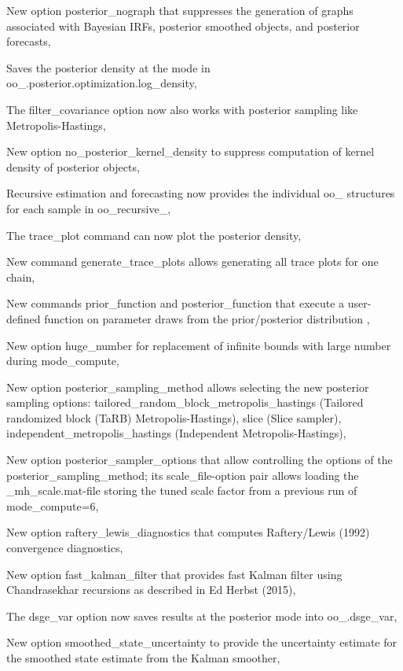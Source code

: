 \documentclass[cn,10pt,math=newtx,citestyle=gb7714-2015,bibstyle=gb7714-2015]{elegantbook}
\begin{document}
\begin{itemize}
		
		New option posterior\_nograph that suppresses the generation of graphs associated with Bayesian IRFs, posterior smoothed objects, and posterior forecasts,
		
		
		Saves the posterior density at the mode in oo\_.posterior.optimization.log\_density,
		
		
		The filter\_covariance option now also works with posterior sampling like Metropolis-Hastings,
		
		
		New option no\_posterior\_kernel\_density to suppress computation of kernel density of posterior objects,
		
		
		Recursive estimation and forecasting now provides the individual
		oo\_ structures for each sample in oo\_recursive\_,
		
		
		The trace\_plot command can now plot the posterior density,
		
		
		New command generate\_trace\_plots allows generating all trace plots for one chain,
		
		
		New commands prior\_function and posterior\_function that execute a user-defined function on parameter draws from the prior/posterior distribution ,
		
		
		New option huge\_number for replacement of infinite bounds with large number during mode\_compute,
		
		
		New option posterior\_sampling\_method allows selecting the new posterior sampling options: tailored\_random\_block\_metropolis\_hastings (Tailored randomized block (TaRB) Metropolis-Hastings), slice (Slice sampler), independent\_metropolis\_hastings (Independent Metropolis-Hastings),
		
		
		New option posterior\_sampler\_options that allow controlling the options of the posterior\_sampling\_method; its scale\_file-option pair allows loading the \_mh\_scale.mat-file storing the tuned scale factor from a previous run of mode\_compute=6,
		
		
		New option raftery\_lewis\_diagnostics that computes Raftery/Lewis (1992) convergence diagnostics,
		
		
		New option fast\_kalman\_filter that provides fast Kalman filter using Chandrasekhar recursions as described in Ed Herbst (2015),
		
		
		The dsge\_var option now saves results at the posterior mode into oo\_.dsge\_var,
		
		
		New option smoothed\_state\_uncertainty to provide the uncertainty estimate for the smoothed state estimate from the Kalman smoother,
		

\end{itemize}
\end{document}
